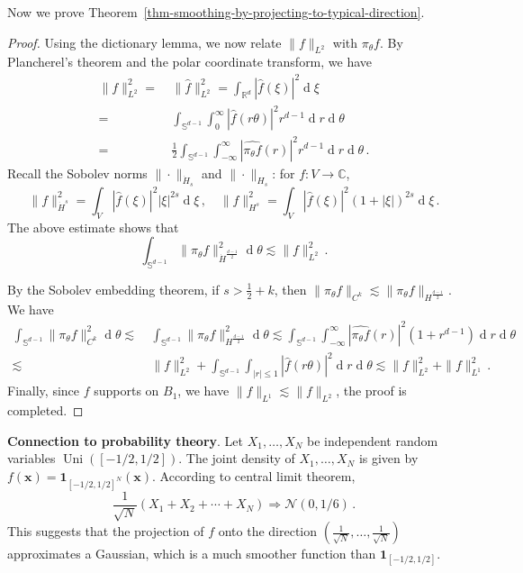 \documentclass[12pt]{amsart}
\newcommand{\CC}{\mathbb{C}}
\newcommand{\RR}{\mathbb{R}}
\begin{document}
Now we prove Theorem~\ref{thm-smoothing-by-projecting-to-typical-direction}.
\begin{proof}
Using the dictionary lemma, we now relate $\|f\|_{L^2}$ with $\pi_\theta f$. By Plancherel's theorem and the polar coordinate transform, we have
\begin{align*}
\|f\|_{L^2}^2=&\ \|\hat{f}\|_{L^2}^2=\int_{\RR^d}|\hat{f}(\xi)|^2\operatorname{d}\!\xi\\
=&\ \int_{\mathbb{S}^{d-1}}\int_0^\infty|\hat{f}(r\theta)|^2r^{d-1}\operatorname{d}\!r\operatorname{d}\!\theta\\
=&\ \frac{1}{2}\int_{\mathbb{S}^{d-1}}\int_{-\infty}^\infty|\widehat{\pi_\theta f}(r)|^2r^{d-1}\operatorname{d}\!r\operatorname{d}\!\theta\,.
\end{align*}
Recall the Sobolev norms $\|\cdot\|_{\dot{H}_s}$ and $\|\cdot\|_{H_s}$: for $f:V\to \CC$, 
\[
\|f\|_{\dot{H}^s}^2=\int_V|\hat{f}(\xi)|^2|\xi|^{2s}\operatorname{d}\!\xi\,,\quad \|f\|_{{H}^s}^2=\int_V|\hat{f}(\xi)|^2(1+|\xi|)^{2s}\operatorname{d}\!\xi\,.
\]
The above estimate shows that
\[
\int_{\mathbb{S}^{d-1}}\|\pi_\theta f\|_{\dot{H}^{\frac{d-1}{2}}}^2\operatorname{d}\!\theta\lesssim \|f\|_{L^2}^2\,.
\]

By the Sobolev embedding theorem, if $s>\frac{1}{2}+k$, then $\|\pi_\theta f\|_{C^k}\lesssim \|\pi_\theta f\|_{H^{\frac{d-1}{2}}}$. We have
\begin{align*}
    \int_{\mathbb{S}^{d-1}}\|\pi_\theta f\|_{C^k}^2\operatorname{d}\!\theta \lesssim&\ \int_{\mathbb{S}^{d-1}}\|\pi_\theta f\|_{H^{\frac{d-1}{2}}}^2\operatorname{d}\!\theta\lesssim\int_{\mathbb{S}^{d-1}}\int_{-\infty}^\infty|\widehat{\pi_\theta f}(r)|^2(1+r^{d-1})\operatorname{d}\!r\operatorname{d}\!\theta\\
    \lesssim&\ \|f\|_{L^2}^2+\int_{\mathbb S^{d-1}}\int_{|r|\le 1}|\hat{f}(r\theta)|^2\operatorname{d}\!r\operatorname{d}\!\theta\lesssim \|f\|_{L^2}^2+\|f\|_{L^1}^2\,.
\end{align*}
Finally, since $f$ supports on $B_1$, we have $\|f\|_{L^1}\lesssim \|f\|_{L^2}$, the proof is completed.
\end{proof}

\textbf{Connection to probability theory}. Let $X_1,\dots,X_N$ be independent random variables $\operatorname{Uni}([-1/2,1/2])$. The joint density of $X_1,\dots,X_N$ is given by $f(\mathbf{x})=\mathbf{1}_{[-1/2,1/2]^N}(\mathbf x)$. According to central limit theorem, 
\[
\frac{1}{\sqrt N}(X_1+X_2+\cdots+X_N)\Rightarrow \mathcal N(0,1/6)\,.
\]
This suggests that the projection of $f$ onto the direction $(\frac{1}{\sqrt N},\dots,\frac{1}{\sqrt N})$ approximates a Gaussian, which is a much smoother function than $\mathbf{1}_{[-1/2,1/2]}$. 
\end{document}
